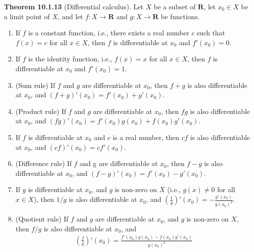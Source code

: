 \documentclass{book}
\newcommand{\titl}[1]{\noindent\textbf{#1}}
\begin{document}
\begin{framed}
\titl{Theorem 10.1.13} (Differential calculus). Let $X$ be a subset of $\mathbf{R}$, let $x_0\in X$ be a limit point of $X$, and let $f:X\to\mathbf{R}$ and $g:X\to\mathbf{R}$ be functions.
\begin{enumerate}
    \item If $f$ is a constant function, i.e., there exists a real number $c$ such that $f(x)=c$ for all $x\in X$, then $f$ is differentiable at $x_0$ and $f'(x_0)=0$.
    \item If $f$ is the identity function, i.e., $f(x)=x$ for all $x\in X$, then $f$ is differentiable at $x_0$ and $f'(x_0)=1$.
    \item (Sum rule) If $f$ and $g$ are differentiable at $x_0$, then $f+g$ is also differentiable at $x_0$, and $(f+g)'(x_0)=f'(x_0)+g'(x_0)$.
    \item (Product rule) If $f$ and $g$ are differentiable at $x_0$, then $fg$ is also differentiable at $x_0$, and $(fg)'(x_0)=f'(x_0)g(x_0)+f(x_0)g'(x_0)$.
    \item If $f$ is differentiable at $x_0$ and $c$ is a real number, then $cf$ is also differentiable at $x_0$, and $(cf)'(x_0)=cf'(x_0)$.
    \item (Difference rule) If $f$ and g are differentiable at $x_0$, then $f-g$ is also differentiable at $x_0$, and $(f-g)'(x_0)=f'(x_0)-g'(x_0)$.
    \item If $g$ is differentiable at $x_0$, and $g$ is non-zero on $X$ (i.e., $g(x)\neq 0$ for all $x\in X$), then $1/g$ is also differentiable at $x_0$, and $(\frac{1}{g})'(x_0)=-\frac{g'(x_0)}{g(x_0)^2}$.
    \item (Quotient rule) If $f$ and $g$ are differentiable at $x_0$, and $g$ is non-zero on $X$, then $f/g$ is also differentiable at $x_0$, and
        \begin{align*}
            \left(\frac{f}{g}\right)'(x_0)=\frac{f'(x_0)g(x_0)-f(x_0)g'(x_0)}{g(x_0)^2}
        \end{align*}
\end{enumerate}
\end{framed}
\end{document}

